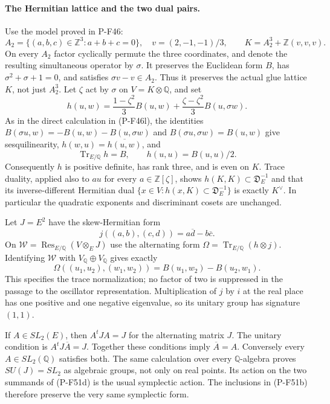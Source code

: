 \paragraph{The Hermitian lattice and the two dual pairs.}
Use the model proved in P-F46:
\[
 A_2=\{(a,b,c)\in\mathbb Z^3:a+b+c=0\},\quad
 v=(2,-1,-1)/3,\qquad
 K=A_2^3+\mathbb Z(v,v,v).
\]
On every $A_2$ factor cyclically permute the three
coordinates, and denote the resulting simultaneous
operator by $\sigma$. It preserves the Euclidean form
$B$, has $\sigma^2+\sigma+1=0$, and satisfies
$\sigma v-v\in A_2$. Thus it preserves the actual glue
lattice $K$, not just $A_2^3$. Let $\zeta$ act by
$\sigma$ on $V=K\otimes\mathbb Q$, and set
\[
 h(u,w)=\frac{1-\zeta^2}{3}B(u,w)
       +\frac{\zeta-\zeta^2}{3}B(u,\sigma w).
 \tag{P-F51c}
\]
As in the direct calculation in (P-F46l), the identities
$B(\sigma u,w)=-B(u,w)-B(u,\sigma w)$ and
$B(\sigma u,\sigma w)=B(u,w)$ give sesquilinearity,
$h(w,u)=\overline{h(u,w)}$, and
\[
       \operatorname{Tr}_{E/\mathbb Q}h=B,
       \qquad h(u,u)=B(u,u)/2.
\]
Consequently $h$ is positive definite, has rank three,
and is even on $K$. Trace duality, applied also to
$au$ for every $a\in\mathbb Z[\zeta]$, shows
$h(K,K)\subset\mathfrak D_E^{-1}$ and that its
inverse-different Hermitian dual
$\{x\in V:h(x,K)\subset\mathfrak D_E^{-1}\}$ is exactly
$K^\vee$. In particular the
quadratic exponents and discriminant cosets are unchanged.

Let $J=E^2$ have the skew-Hermitian form
\[
 j((a,b),(c,d))=a\overline d-b\overline c.
\]
On $\mathcal W=\operatorname{Res}_{E/\mathbb Q}(V\otimes_EJ)$
use the alternating form
$\Omega=\operatorname{Tr}_{E/\mathbb Q}(h\otimes j)$.
Identifying $\mathcal W$ with $V_{\mathbb Q}\oplus V_{\mathbb Q}$
gives exactly
\[
 \Omega((u_1,u_2),(w_1,w_2))
            =B(u_1,w_2)-B(u_2,w_1).
 \tag{P-F51d}
\]
This specifies the trace normalization; no factor of two
is suppressed in the passage to the oscillator representation.
Multiplication of $j$ by $i$ at the real place has one
positive and one negative eigenvalue, so its unitary
group has signature $(1,1)$.

If $A\in SL_2(E)$, then $A^tJA=J$ for the alternating
matrix $J$. The unitary condition is $A^tJ\overline A=J$.
Together these conditions imply $\overline A=A$.
Conversely every $A\in SL_2(\mathbb Q)$ satisfies both.
The same calculation over every $\mathbb Q$-algebra
proves $SU(J)=SL_2$ as algebraic groups, not only on
real points. Its action on the two summands of (P-F51d)
is the usual symplectic action. The inclusions in
(P-F51b) therefore preserve the very same symplectic form.

